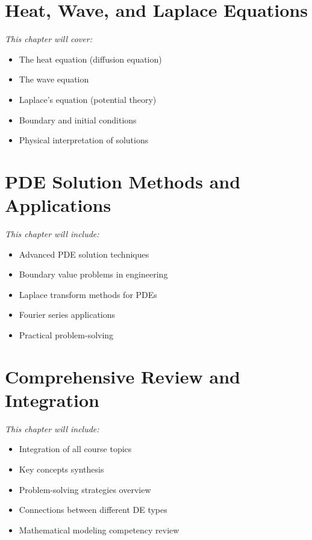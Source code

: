 \documentclass[12pt, letterpaper]{book}
\theoremstyle{problemstyle}
\theoremstyle{solutionstyle}
\begin{document}
\chapter{Heat, Wave, and Laplace Equations}
\label{chap:session_18}

\textit{This chapter will cover:}
\begin{itemize}
    \item The heat equation (diffusion equation)
    \item The wave equation
    \item Laplace's equation (potential theory)
    \item Boundary and initial conditions
    \item Physical interpretation of solutions
\end{itemize}

\chapter{PDE Solution Methods and Applications}
\label{chap:session_19}

\textit{This chapter will include:}
\begin{itemize}
    \item Advanced PDE solution techniques
    \item Boundary value problems in engineering
    \item Laplace transform methods for PDEs
    \item Fourier series applications
    \item Practical problem-solving
\end{itemize}


\chapter{Comprehensive Review and Integration}
\label{chap:session_20}

\textit{This chapter will include:}
\begin{itemize}
    \item Integration of all course topics
    \item Key concepts synthesis
    \item Problem-solving strategies overview
    \item Connections between different DE types
    \item Mathematical modeling competency review
\end{itemize}
\end{document}
